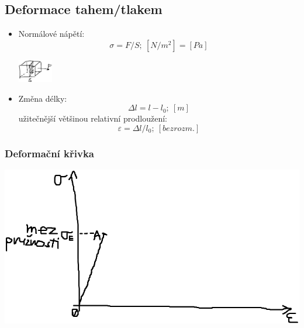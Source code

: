 \documentclass{article}
\begin{document}
  \subsection{Deformace tahem/tlakem}

    \begin{itemize}
      \item Normálové nápětí:
      	\begin{equation}
          \sigma=F/S; \ [N/m^2] = [Pa]
        \end{equation}
        \begin{center}
          \vspace{-0.25cm}\includegraphics[width=0.12\textwidth]{normalove_napeti}\vspace{-0.25cm}
        \end{center}
      \item Změna délky:
        \begin{equation}
          \Delta l = l - l_0; \ [m]
        \end{equation}
      užitečnější většinou relativní prodloužení:
        \begin{equation}
          \varepsilon = \Delta l/l_0; \ [bezrozm.]
        \end{equation}
    \end{itemize}

    \subsubsection{Deformační křivka}
      \begin{center}
        \vspace{-0.1cm}\includegraphics[width=0.75\linewidth]{deformacni_krivka}\vspace{-0.25cm}
      \end{center}
\end{document}
